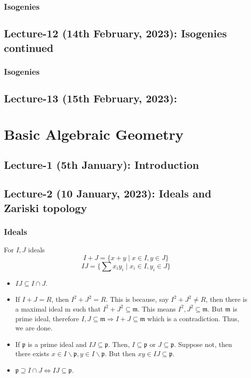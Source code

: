 \documentclass[oneside, 12pt]{scrbook}
\theoremstyle{theorem}
\begin{document}
\section{Isogenies}

\chapter{Lecture-12 (14th February, 2023): Isogenies continued}
\section{Isogenies}


\chapter{Lecture-13 (15th February, 2023): }




\part{Basic Algebraic Geometry}

\chapter{Lecture-1 (5th January): Introduction}

\chapter{Lecture-2 (10 January, 2023): Ideals and Zariski topology}

\section{Ideals}
For $I,J$ ideals $$I+J = \{x+y \mid x\in I, y\in J\}$$ $$IJ = \{\sum x_{i}y_{i} \mid x_{i} \in I, y_{i} \in J\}$$

\begin{itemize}
\item $IJ \subseteq I \cap J$.
\item If $I+J = R$, then $I^2 + J^2 = R$. This is because, say $I^2 + J^2 \neq R$, then there is a maximal ideal $\mathrm{m}$ such that $I^2 + J^2 \subseteq \mathfrak{m}$. This means $I^2, J^2 \subseteq \mathfrak{m}$. But $\mathfrak{m}$ is prime ideal, therefore $I,J \subseteq \mathfrak{m} \Rightarrow I+J \subseteq \mathfrak{m}$ which is a contradiction. Thus, we are done. 
\item If $\mathfrak{p}$ is a prime ideal and $IJ \subseteq \mathfrak{p}$. Then, $I \subseteq \mathfrak{p}$ or $J \subseteq \mathfrak{p}$. Suppose not, then there exists $x \in I \backslash \mathfrak{p} , y \in I \backslash \mathfrak{p}$. But then $xy \in IJ \subseteq \mathfrak{p}$.
\item $\mathfrak{p} \supseteq I \cap J \Leftrightarrow IJ \subseteq \mathfrak{p}$.
\end{itemize}
\end{document}
